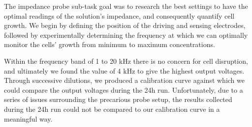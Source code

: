 The impedance probe sub-task goal was to research the best settings to have the optimal readings of the solution's impedance, and consequently quantify cell growth.
We begin by defining the position of the driving and sensing electrodes, followed by experimentally determining the frequency at which we can optimally monitor the cells' growth from minimum to maximum concentrations.

Within the frequency band of 1 to 20 kHz there is no concern for cell disruption, and ultimately we found the value of 4 kHz to give the highest output voltages.
Through successive dilutions, we produced a calibration curve against which we could compare the output voltages during the 24h run.
Unfortunately, due to a series of issues surrounding the precarious probe setup, the results collected during the 24h run could not be compared to our calibration curve in a meaningful way.